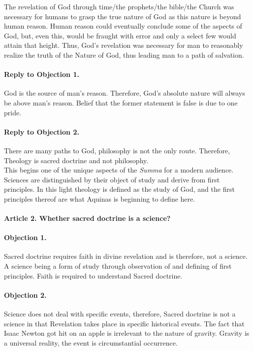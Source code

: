 \documentclass{ucetd}
\begin{document}
The revelation of God through time/the prophets/the bible/the Church was necessary for humans to grasp the true nature of God as this nature is beyond human reason. Human reason could eventually conclude some of the aspects of God, but, even this, would be fraught with error and only a select few would attain that height. Thus, God's revelation was necessary for man to reasonably realize the truth of the Nature of God, thus leading man to a path of salvation.
\paragraph{Reply to Objection 1.}

God is the source of man's reason. Therefore, God's absolute nature will always be above man's reason. Belief that the former statement is false is due to one pride.
\paragraph{Reply to Objection 2.}

There are many paths to God, philosophy is not the only route. Therefore, Theology is sacred doctrine and not philosophy.\\
This begins one of the unique aspects of the \textit{Summa} for a modern audience. Sciences are distinguished by their object of study and derive from first principles. In this light theology is defined as the study of God, and the first principles thereof are what Aquinas is beginning to define here.

\paragraph{Article 2. Whether sacred doctrine is a science?}
\paragraph{Objection 1.}
Sacred doctrine requires faith in divine revelation and is therefore, not a science. A science being a form of study through observation of and defining of first principles. Faith is required to understand Sacred doctrine.
\paragraph{Objection 2.}
Science does not deal with specific events, therefore, Sacred doctrine is not a science in that Revelation takes place in specific historical events. The fact that Isaac Newton got hit on an apple is irrelevant to the nature of gravity. Gravity is a universal reality, the event is circumstantial occurrence.
\end{document}
